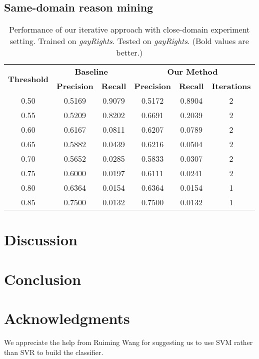 \documentclass[11pt,a4paper]{article}
\begin{document}
\subsection{Same-domain reason mining}

\begin{table*}[h]
\begin{center}
\begin{tabular}{|c||c|c|c|c|c|}
\hline
\multicolumn{1}{|c|}{\multirow{2}{*}{\bf Threshold}} & \multicolumn{2}{c|}{\bf Baseline}  & \multicolumn{3}{c|}{\bf Our Method}    \\ \cline{2-6} 
\multicolumn{1}{|c|}{}   & \multicolumn{1}{l|}{\bf Precision} & \multicolumn{1}{l|}{\bf Recall} & \multicolumn{1}{l|}{\bf Precision} & \multicolumn{1}{c|}{\bf Recall} & \multicolumn{1}{l|}{\bf Iterations} \\ \hline
 \hline
0.50 & 0.5169 & 0.9079 & 0.5172 & 0.8904 & 2 \\
0.55 & 0.5209 & 0.8202 & 0.6691 & 0.2039 & 2 \\
0.60 & 0.6167 & 0.0811 & 0.6207 & 0.0789 & 2 \\
0.65 & 0.5882 & 0.0439 & 0.6216 & 0.0504 & 2 \\
0.70 & 0.5652 & 0.0285 & 0.5833 & 0.0307 & 2 \\
0.75 & 0.6000 & 0.0197 & 0.6111 & 0.0241 & 2 \\
0.80 & 0.6364 & 0.0154 & 0.6364 & 0.0154 & 1 \\
0.85 & 0.7500 & 0.0132 & 0.7500 & 0.0132 & 1
\\\hline
\end{tabular}
\end{center}
\caption{\label{tab:same-topic} Performance of our iterative approach with close-domain experiment setting. Trained on {\it gayRights}. Tested on {\it gayRights}. (Bold values are better.)}
\end{table*}

\section{Discussion}
\label{sec:discussion}

\section{Conclusion}
\label{sec:conclusion}


\section*{Acknowledgments}

We appreciate the help from Ruiming Wang for suggesting us to use SVM rather than SVR to build the classifier. 

% 
%


\end{document}

